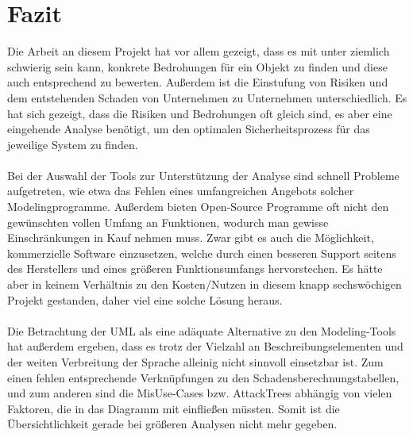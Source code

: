 \section{Fazit}
Die Arbeit an diesem Projekt hat vor allem gezeigt, dass es mit unter ziemlich schwierig sein kann, konkrete Bedrohungen für ein Objekt zu finden und diese auch entsprechend zu bewerten. Außerdem ist die Einstufung von Risiken und dem entstehenden Schaden von Unternehmen zu Unternehmen unterschiedlich. Es hat sich gezeigt, dass die Risiken und Bedrohungen oft gleich sind, es aber eine eingehende Analyse benötigt, um den optimalen Sicherheitsprozess für das jeweilige System zu finden.
\\
\\
Bei der Auswahl der Tools zur Unterstützung der Analyse sind schnell Probleme aufgetreten, wie etwa das Fehlen eines umfangreichen Angebots solcher Modelingprogramme. Außerdem bieten Open-Source Programme oft nicht den gewünschten vollen Umfang an Funktionen, wodurch man gewisse Einschränkungen in Kauf nehmen muss. Zwar gibt es auch die Möglichkeit, kommerzielle Software einzusetzen, welche durch einen besseren Support seitens des Herstellers und eines größeren Funktionsumfangs hervorstechen. Es hätte aber in keinem Verhältnis zu den Kosten/Nutzen in diesem knapp sechswöchigen Projekt gestanden, daher viel eine solche Lösung heraus.
\\
\\
Die Betrachtung der UML als eine adäquate Alternative zu den Modeling-Tools hat außerdem ergeben, dass es trotz der Vielzahl an Beschreibungselementen und der weiten Verbreitung der Sprache alleinig nicht sinnvoll einsetzbar ist. Zum einen fehlen entsprechende Verknüpfungen zu den Schadensberechnungstabellen, und zum anderen sind die MisUse-Cases bzw. AttackTrees abhängig von vielen Faktoren, die in das Diagramm mit einfließen müssten. Somit ist die Übersichtlichkeit gerade bei größeren Analysen nicht mehr gegeben.